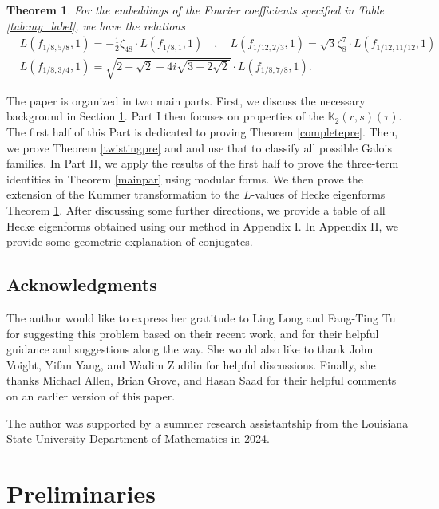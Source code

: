 \documentclass[12pt]{amsart}
\newtheorem{theorem}{Theorem}[section]
\theoremstyle{definition}
\theoremstyle{remark}
\begin{document}
\begin{theorem}\label{relations}
    For the embeddings of the Fourier coefficients specified in Table \ref{tab:my_label}, we have the relations
    \begin{align*}
       & L(f_{1/8,5/8},1)=-\frac{1}{2}\zeta_{48}\cdot L(f_{1/8,1},1)\quad ,\quad L(f_{1/12,2/3},1)=\sqrt{3}\zeta_8^7\cdot L(f_{1/12,11/12},1)\\&
       L(f_{1/8,3/4},1)=\sqrt{2 - \sqrt{2} - 4 i \sqrt{3 - 2 \sqrt{2}}}\cdot L(f_{1/8,7/8},1).
    \end{align*}

\end{theorem}
 
The paper is organized in two main parts. First, we discuss the necessary background in Section \ref{prelim}. Part I then focuses on properties of the $\mathbb{K}_2(r,s)(\tau)$. The first half of this Part is dedicated to proving Theorem \ref{completepre}. Then, we prove Theorem \ref{twistingpre} and and use that to classify all possible Galois families.  
In Part II, we apply the results of the first half to prove the three-term identities in Theorem \ref{mainpar} using modular forms. We then prove the extension of the Kummer transformation to the $L$-values of Hecke eigenforms Theorem \ref{relations}. After discussing some further directions, we provide a table of all Hecke eigenforms obtained using our method in Appendix I. In Appendix II, we provide some geometric explanation of conjugates.


\bigskip

\subsection*{Acknowledgments}  The author would like to express her gratitude to Ling Long and Fang-Ting Tu for suggesting this problem based on their recent work, and for their helpful guidance and suggestions along the way. She would also like to thank John Voight, Yifan Yang, and Wadim Zudilin for helpful discussions. Finally, she thanks Michael Allen, Brian Grove, and Hasan Saad for their helpful comments on an earlier version of this paper.

The author was supported by a summer research assistantship from the Louisiana State University Department of Mathematics in 2024.

\bigskip

\section{Preliminaries}\label{prelim}
\end{document}
